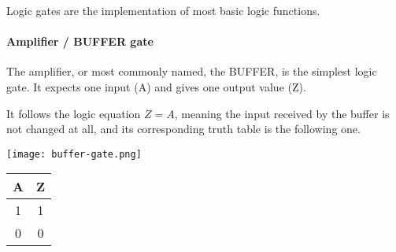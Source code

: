 \begin{definition}
    Logic gates are the implementation of most basic logic functions.
\end{definition}

\paragraph{Amplifier / BUFFER gate}
\begin{definition} The amplifier, or most commonly named, the BUFFER, is the simplest logic gate. It expects one input (A) and gives one output value (Z).
\end{definition}

It follows the logic equation $Z = A$, meaning the input received by the buffer is not changed at all, and its corresponding truth table is the following one.

\begin{minipage}{\textwidth}
\vspace{1cm}
\begin{minipage}[c]{0.49\textwidth}
    \centering
    \texttt{[image: buffer-gate.png]}
\end{minipage}
\hfill
\begin{minipage}[c]{.49\textwidth}
    \centering
    \begin{tabular}{ |c|c| } \hline 
        \textbf{A} & \textbf{Z} \\ \hline
        1 & 1 \\
        0 & 0 \\
        \hline
    \end{tabular}
\end{minipage}
\end{minipage}


